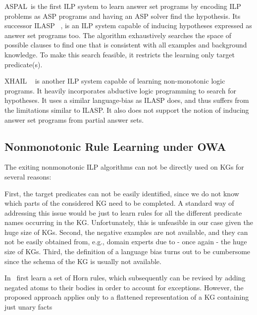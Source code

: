 ASPAL~\cite{}is the first ILP system to learn answer set programs by encoding ILP problems
as ASP programs and having an ASP solver find the hypothesis. Its successor ILASP ~\cite{}, is an ILP system capable of inducing hypotheses expressed as answer set programs
too.  The algorithm exhaustively searches the space of possible clauses to find one that
is consistent with all examples and background knowledge. To make this search feasible, it restricts the learning only target predicate(s).

XHAIL ~\cite{} is another ILP system capable of learning non-monotonic logic programs. It
heavily incorporates abductive logic programming to search for hypotheses. It uses a similar
language-bias as ILASP does, and thus suffers from the limitations similar to ILASP. It also
does not support the notion of inducing answer set programs from partial answer sets.


\subsection{Nonmonotonic Rule Learning under OWA}
The exiting nonmonotonic ILP algorithms can not be directly used on KGs for several reasons:

 First, the target predicates can not be easily identified, since
we do not know which parts of the considered KG need to be completed. A standard
way of addressing this issue would be just to learn rules for all the different predicate
names occurring in the KG. Unfortunately, this is unfeasible in our case given the huge
size of KGs. Second, the negative examples are not available, and they can not be easily
obtained from, e.g., domain experts due to - once again - the huge size of KGs. Third,
the definition of a language bias turns out to be cumbersome since the schema of the
KG is usually not available.



 In~\cite{gad2016} first learn a set of Horn rules, which subsequently can be revised by
adding negated atoms to their bodies in order to account for exceptions. However, the
proposed approach applies only to a flattened representation of a KG containing just
unary facts

